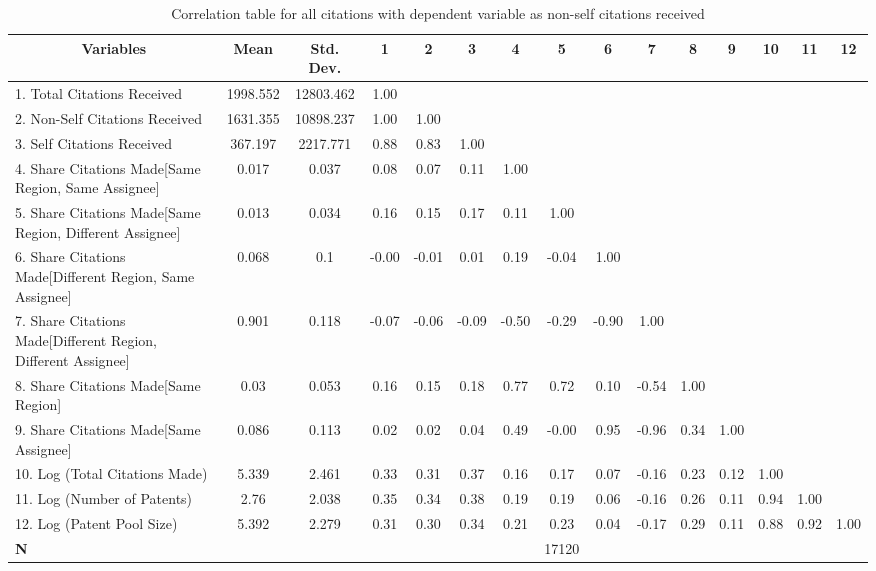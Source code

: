 \begin{sidewaystable}[htbp]\centering \caption{Correlation table for all citations  with dependent variable as non-self citations received\label{a.e.o.t.n.ncorrelation}}
\scriptsize
\onehalfspacing
\begin{tabular}{l  c  c  c  c  c  c  c  c  c  c  c  c  c  c }\hline\hline
\multicolumn{1}{c}{Variables} & \textbf{Mean}& \textbf{Std. Dev.}&1&2&3&4&5&6&7&8&9&10&11&12\\ \hline
1. Total Citations Received & 1998.552 & 12803.462&1.00\\
2. Non-Self Citations Received& 1631.355 & 10898.237&1.00&1.00\\
3. Self Citations Received& 367.197 & 2217.771&0.88&0.83&1.00\\
4. Share Citations Made[Same Region, Same Assignee]& 0.017 & 0.037&0.08&0.07&0.11&1.00\\
5. Share Citations Made[Same Region, Different Assignee]& 0.013 & 0.034&0.16&0.15&0.17&0.11&1.00\\
6. Share Citations Made[Different Region, Same Assignee]& 0.068 & 0.1 &-0.00&-0.01&0.01&0.19&-0.04&1.00\\
7. Share Citations Made[Different Region, Different Assignee]& 0.901 & 0.118&-0.07&-0.06&-0.09&-0.50&-0.29&-0.90&1.00\\
8. Share Citations Made[Same Region]& 0.03 & 0.053&0.16&0.15&0.18&0.77&0.72&0.10&-0.54&1.00\\
9. Share Citations Made[Same Assignee] & 0.086 & 0.113&0.02&0.02&0.04&0.49&-0.00&0.95&-0.96&0.34&1.00\\
10. Log (Total Citations Made) & 5.339 & 2.461  &0.33&0.31&0.37&0.16&0.17&0.07&-0.16&0.23&0.12&1.00\\
11. Log (Number of Patents)& 2.76 & 2.038 &0.35&0.34&0.38&0.19&0.19&0.06&-0.16&0.26&0.11&0.94&1.00\\
12. Log (Patent Pool Size) & 5.392 & 2.279&0.31&0.30&0.34&0.21&0.23&0.04&-0.17&0.29&0.11&0.88&0.92&1.00\\
\hline
\textbf{N}&&&&&&&17120\\
\hline \hline 
 \end{tabular}
\end{sidewaystable}
